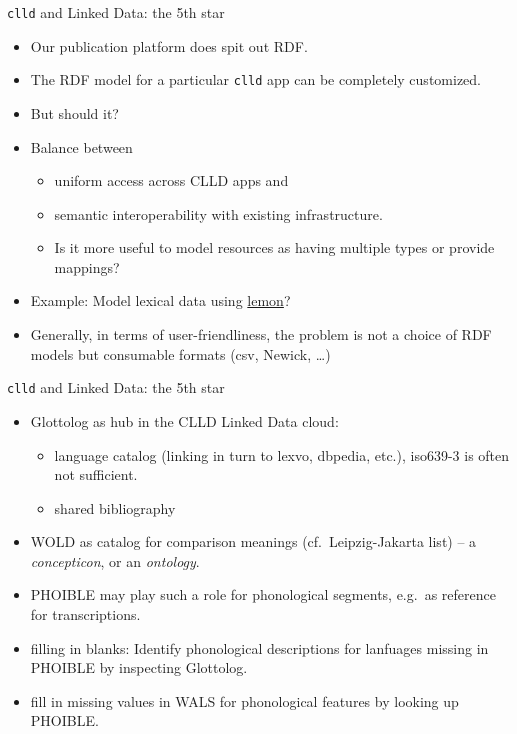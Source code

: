 \documentclass{beamer}
\begin{document}
\begin{frame}{\texttt{clld} and Linked Data: the 5th star}
\begin{itemize}
\item Our publication platform does spit out RDF.
\item The RDF model for a particular \texttt{clld} app can be completely customized.
\item But should it? 
\item Balance between
\begin{itemize}
\item uniform access across CLLD apps and 
\item semantic interoperability with existing infrastructure.
\item Is it more useful to model resources as having multiple types or provide mappings? 
\end{itemize}
\item Example: Model lexical data using \href{http://lemon-model.net}{lemon}?
\item Generally, in terms of user-friendliness, the problem is not a choice of RDF models
but consumable formats (csv, Newick, \dots)
\end{itemize}
\end{frame}


\begin{frame}{\texttt{clld} and Linked Data: the 5th star}
\begin{itemize}
\item Glottolog as hub in the CLLD Linked Data cloud:
\begin{itemize}
\item language catalog (linking in turn to lexvo, dbpedia, etc.), iso639-3 is often not sufficient.
\item shared bibliography
\end{itemize}
\item WOLD as catalog for comparison meanings (cf.~Leipzig-Jakarta list) -- a \emph{concepticon}, or an \emph{ontology}.
\item PHOIBLE may play such a role for phonological segments, e.g.~as reference for transcriptions.

\item filling in blanks: Identify phonological descriptions for lanfuages missing in PHOIBLE by inspecting Glottolog.
\item fill in missing values in WALS for phonological features by looking up PHOIBLE.
\end{itemize}
\end{frame}
\end{document}
